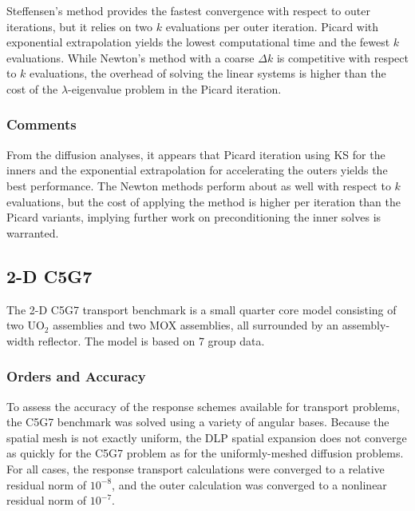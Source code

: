 Steffensen's method provides the fastest convergence with respect to 
outer iterations, but it relies on two $k$ evaluations per outer iteration.
Picard with exponential extrapolation yields the lowest computational 
time and the fewest $k$ evaluations.  While Newton's method with a 
coarse $\Delta k$ is competitive with respect to $k$ evaluations, the 
overhead of solving the linear systems is higher than the cost of the 
$\lambda$-eigenvalue problem in the Picard iteration.


\subsubsection{Comments}

From the diffusion analyses, it appears that Picard iteration using 
KS for the inners and the exponential extrapolation for accelerating 
the outers yields the best performance.  The Newton methods perform 
about as well with respect to $k$ evaluations, but the cost of 
applying the method is higher per iteration than the Picard variants,
implying further work on preconditioning the inner solves is warranted.

\subsection{2-D C5G7}

The 2-D C5G7 transport benchmark is a small quarter core 
model consisting of two UO$_2$ assemblies and two MOX
assemblies, all surrounded by an assembly-width reflector.  The model 
is based on 7 group data.
 
\subsubsection{Orders and Accuracy}
 
To assess the accuracy of the response schemes available for transport 
problems, the C5G7 benchmark was solved using a variety of 
angular bases. Because the 
spatial mesh is not exactly uniform, the DLP spatial expansion does
not converge as quickly for the C5G7 problem as for the 
uniformly-meshed diffusion problems.  For all cases, 
the response transport calculations were converged to 
a relative residual norm of $10^{-8}$, and the outer calculation was 
converged to a nonlinear residual norm of $10^{-7}$.

